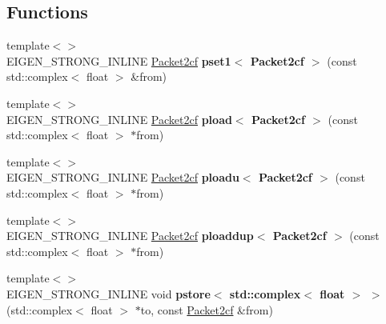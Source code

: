 \subsection*{Functions}
\begin{DoxyCompactItemize}
\item 
\mbox{\label{namespace_eigen_1_1internal_a6bfd29ca2b2f1100bd1936dfb43129a2}} 
{\footnotesize template$<$$>$ }\\E\+I\+G\+E\+N\+\_\+\+S\+T\+R\+O\+N\+G\+\_\+\+I\+N\+L\+I\+NE \hyperlink{struct_eigen_1_1internal_1_1_packet2cf}{Packet2cf} {\bfseries pset1$<$ Packet2cf $>$} (const std\+::complex$<$ float $>$ \&from)
\item 
\mbox{\label{namespace_eigen_1_1internal_aa14f73affd0f1fa2f18bdcc799ea07af}} 
{\footnotesize template$<$$>$ }\\E\+I\+G\+E\+N\+\_\+\+S\+T\+R\+O\+N\+G\+\_\+\+I\+N\+L\+I\+NE \hyperlink{struct_eigen_1_1internal_1_1_packet2cf}{Packet2cf} {\bfseries pload$<$ Packet2cf $>$} (const std\+::complex$<$ float $>$ $\ast$from)
\item 
\mbox{\label{namespace_eigen_1_1internal_a93a6bdeb40170c6379a9ad832e01d300}} 
{\footnotesize template$<$$>$ }\\E\+I\+G\+E\+N\+\_\+\+S\+T\+R\+O\+N\+G\+\_\+\+I\+N\+L\+I\+NE \hyperlink{struct_eigen_1_1internal_1_1_packet2cf}{Packet2cf} {\bfseries ploadu$<$ Packet2cf $>$} (const std\+::complex$<$ float $>$ $\ast$from)
\item 
\mbox{\label{namespace_eigen_1_1internal_a3a8c9a3f6c0beacc89b92bca87be0c81}} 
{\footnotesize template$<$$>$ }\\E\+I\+G\+E\+N\+\_\+\+S\+T\+R\+O\+N\+G\+\_\+\+I\+N\+L\+I\+NE \hyperlink{struct_eigen_1_1internal_1_1_packet2cf}{Packet2cf} {\bfseries ploaddup$<$ Packet2cf $>$} (const std\+::complex$<$ float $>$ $\ast$from)
\item 
\mbox{\label{namespace_eigen_1_1internal_a8e237ac8f7caa72acdcf78ccdad5c838}} 
{\footnotesize template$<$$>$ }\\E\+I\+G\+E\+N\+\_\+\+S\+T\+R\+O\+N\+G\+\_\+\+I\+N\+L\+I\+NE void {\bfseries pstore$<$ std\+::complex$<$ float $>$ $>$} (std\+::complex$<$ float $>$ $\ast$to, const \hyperlink{struct_eigen_1_1internal_1_1_packet2cf}{Packet2cf} \&from)

\end{DoxyCompactItemize}
